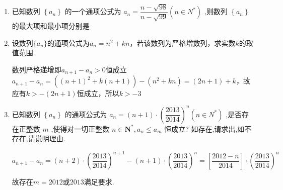 \begin{enumerate}
\begin{jieda}
        \begin{enumerate}
            \item $ {a}_{n + 1} - {a}_{n} = \left\lbrack  {1 + {\left( \dfrac{1}{2}\right) }^{n + 1}}\right\rbrack   - \left\lbrack  {1 + {\left( \dfrac{1}{2}\right) }^{n}}\right\rbrack $
            $ =  - {\left( \dfrac{1}{2}\right) }^{n + 1} < 0, $
            所以 $ {a}_{n + 1} < {a}_{n} $ . 因此数列 $ \left\{  {a}_{n}\right\} $ 为严格减数列,从而是单调数列.
            \item 因为$ {a}_{n + 1} - {a}_{n} = \left( {n + 1 - \dfrac{1}{n + 1}}\right)  - \left( {n - \dfrac{1}{n}}\right) $
            $ = 1 + \dfrac{1}{n\left( {n + 1}\right) } > 0, $
            所以 $ {a}_{n + 1} > {a}_{n} $ . 因此数列 $ \left\{  {a}_{n}\right\} $ 为严格增数列,从而是单调数列. \\
            \ps 如果数列对应的函数是单调函数，那么数列的增减性和函数相同.
        \end{enumerate}
    \end{jieda}
    \item 已知数列 $\left\{  {a}_{n}\right\}$ 的一个通项公式为 ${a}_{n} = \dfrac{n - \sqrt{98}}{n - \sqrt{99}}\left( {n \in  {N}^{ * }}\right)$ ,则数列 $\left\{  {a}_{n}\right\}$ 的最大项和最小项分别是
    \item 设数列$\{a_n\}$的通项公式为$a_n = n^2+kn$，若该数列为严格增数列，求实数$k$的取值范围.
    \begin{jieda}
        数列严格递增即$a_{n+1} - a_n > 0$恒成立 \\
        $a_{n+1} - a_n = ((n+1)^2+k(n+1))-(n^2+kn) = (2n+1)+k$，故应有$k > -(2n+1)$恒成立，所以$k > -3$
    \end{jieda}
    \item 已知数列 $\left\{  {a}_{n}\right\}$ 的通项公式为 ${a}_{n} = \left( {n + 1}\right)  \cdot  {\left( \dfrac{2013}{2014}\right) }^{n}\left( {n \in  {N}^{ * }}\right)$ ,是否存在正整数 $m$ ,使得对一切正整数 $n \in  {\mathbf{N}}^{ * },a_{n} \leq  a_{m}$ 恒成立? 如存在,请求出,如不存在,请说明理由.
    \begin{jieda}
        $a_{n+1} - a_n = (n+2) \cdot \left(\dfrac{2013}{2014}\right)^{n+1} - (n+1) \cdot \left(\dfrac{2013}{2014}\right)^n = \left[\dfrac{2012-n}{2014}\right] \cdot \left(\dfrac{2013}{2014}\right)^n$

        
        故存在$m = 2012$或$2013$满足要求.
    \end{jieda}
\end{enumerate}
